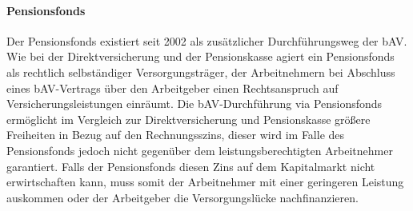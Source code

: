 \paragraph*{Pensionsfonds}

Der Pensionsfonds existiert seit 2002 als zusätzlicher Durchführungsweg der bAV. Wie bei der Direktversicherung und der Pensionskasse agiert ein Pensionsfonds als rechtlich selbständiger Versorgungsträger, der Arbeitnehmern bei Abschluss eines bAV-Vertrags über den Arbeitgeber einen Rechtsanspruch auf Versicherungsleistungen einräumt. Die bAV-Durchführung via Pensionsfonds ermöglicht im Vergleich zur Direktversicherung und Pensionskasse größere Freiheiten in Bezug auf den Rechnungsszins, dieser wird im Falle des Pensionsfonds jedoch nicht gegenüber dem leistungsberechtigten Arbeitnehmer garantiert. Falls der Pensionsfonds diesen Zins auf dem Kapitalmarkt nicht erwirtschaften kann, muss somit der Arbeitnehmer mit einer geringeren Leistung auskommen oder der Arbeitgeber die Versorgungslücke nachfinanzieren. 

